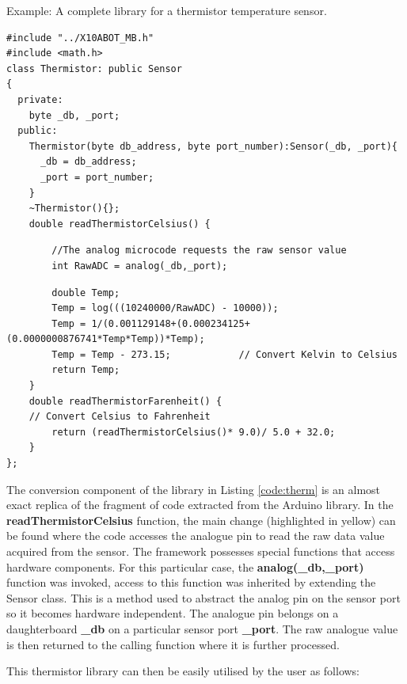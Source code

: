 \begin{listing}
		\footnotesize
		\caption{Example: A complete library for a thermistor temperature sensor.} \label{code:therm}
		\begin{verbatim}
#include "../X10ABOT_MB.h"
#include <math.h>
class Thermistor: public Sensor
{
  private:
    byte _db, _port;
  public:
    Thermistor(byte db_address, byte port_number):Sensor(_db, _port){
      _db = db_address;
      _port = port_number;
    }
    ~Thermistor(){};
    double readThermistorCelsius() {
    \end{verbatim}
    \begin{verbatim}
        //The analog microcode requests the raw sensor value
        int RawADC = analog(_db,_port); 
    \end{verbatim}
    \begin{verbatim}
        double Temp;
        Temp = log(((10240000/RawADC) - 10000));
        Temp = 1/(0.001129148+(0.000234125+(0.0000000876741*Temp*Temp))*Temp);
        Temp = Temp - 273.15;            // Convert Kelvin to Celsius
        return Temp;
    }
    double readThermistorFarenheit() {
    // Convert Celsius to Fahrenheit
        return (readThermistorCelsius()* 9.0)/ 5.0 + 32.0;
    }
};
	\end{verbatim}
		
\end{listing}

The conversion component of the library in Listing \ref{code:therm} is an almost exact replica of the fragment of code extracted from the Arduino library. In the \textbf{readThermistorCelsius} function, the main change (highlighted in yellow) can be found where the code accesses the analogue pin to read the raw data value acquired from the sensor. The \xten framework possesses special functions that access hardware components. For this particular case, the \textbf{analog(\_db,\_port)} function was invoked, access to this function was inherited by extending the Sensor class. This is a method used to abstract the analog pin on the sensor port so it becomes hardware independent. The analogue pin belongs on a daughterboard \textbf{\_db} on a particular sensor port \textbf{\_port}. The raw analogue value is then returned to the calling function where it is further processed.

This thermistor library can then be easily utilised by the user as follows:

